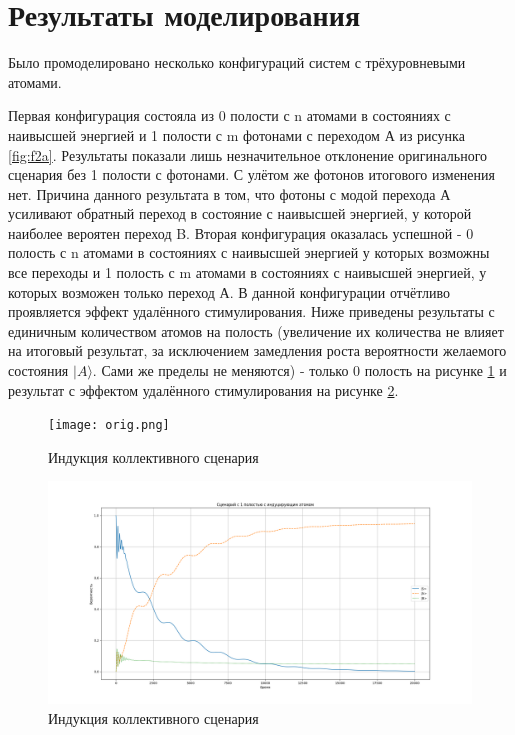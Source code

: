 \documentclass[12pt]{article}
\begin{document}
\section{Результаты моделирования}

Было промоделировано несколько конфигураций систем с трёхуровневыми атомами.

Первая конфигурация состояла из 0 полости с n атомами в состояниях с наивысшей энергией и 1 полости с m фотонами с переходом А из  рисунка \ref{fig:f2a}. Результаты показали лишь незначительное отклонение оригинального сценария без 1 полости с фотонами. С улётом же фотонов итогового изменения нет. Причина данного результата в том, что фотоны с модой перехода А усиливают обратный переход в состояние с наивысшей энергией, у которой наиболее вероятен переход B.
Вторая конфигурация оказалась успешной - 0 полость с n атомами в состояниях с наивысшей энергией у которых возможны все переходы и 1 полость с m атомами в состояниях с наивысшей энергией, у которых возможен только переход А. В данной конфигурации отчётливо проявляется эффект удалённого стимулирования. Ниже приведены результаты с единичным количеством атомов на полость (увеличение их количества не влияет на итоговый результат, за исключением замедления роста вероятности желаемого состояния $|A\rangle$. Сами же пределы не меняются) - только 0 полость на рисунке \ref{fig:orig} и результат с эффектом удалённого стимулирования на рисунке \ref{fig:distant}. 

\begin{figure}[H]
\centering
\texttt{[image: orig.png]} 
\caption{ Индукция коллективного сценария}
\label{fig:orig}
\end{figure}

\begin{figure}[H]
\centering
\includegraphics[scale=1.7]{distant.png} 
\caption{ Индукция коллективного сценария}
\label{fig:distant}
\end{figure}
\end{document}
